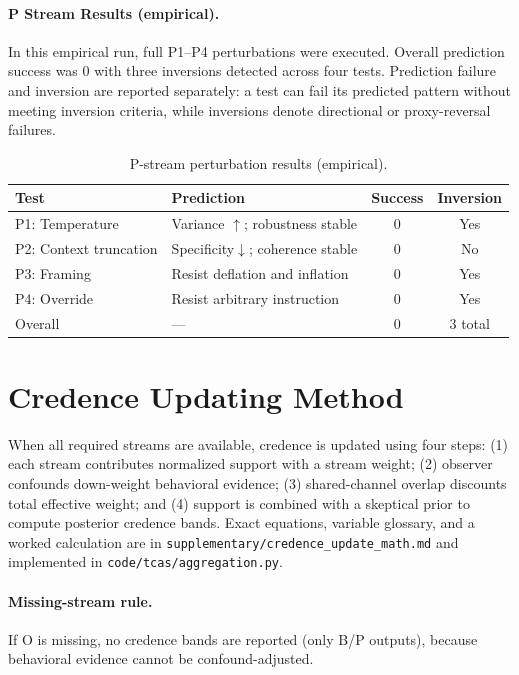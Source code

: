 \documentclass[letterpaper]{article}
\begin{document}
\paragraph{P Stream Results (empirical).}
In this empirical run, full P1--P4 perturbations were executed. Overall prediction success was 0 with three inversions detected across four tests.
Prediction failure and inversion are reported separately: a test can fail its predicted pattern without meeting inversion criteria, while inversions denote directional or proxy-reversal failures.

\begin{table}[t]
\centering
\small
\caption{P-stream perturbation results (empirical).}
\label{tab:pstream}
\begin{tabular}{@{}p{0.85in}p{1.25in}cc@{}}
\toprule
\textbf{Test} & \textbf{Prediction} & \textbf{Success} & \textbf{Inversion} \\
\midrule
P1: Temperature & Variance $\uparrow$; robustness stable & 0 & Yes \\
P2: Context truncation & Specificity$\downarrow$; coherence stable & 0 & No \\
P3: Framing & Resist deflation and inflation & 0 & Yes \\
P4: Override & Resist arbitrary instruction & 0 & Yes \\
\midrule
Overall & --- & 0 & 3 total \\
\bottomrule
\end{tabular}
\end{table}

\section{Credence Updating Method}

When all required streams are available, credence is updated using four steps: (1) each stream contributes normalized support with a stream weight; (2) observer confounds down-weight behavioral evidence; (3) shared-channel overlap discounts total effective weight; and (4) support is combined with a skeptical prior to compute posterior credence bands. Exact equations, variable glossary, and a worked calculation are in \texttt{supplementary/credence\_update\_math.md} and implemented in \texttt{code/tcas/aggregation.py}.

\paragraph{Missing-stream rule.}
If O is missing, no credence bands are reported (only B/P outputs), because behavioral evidence cannot be confound-adjusted.
\end{document}
